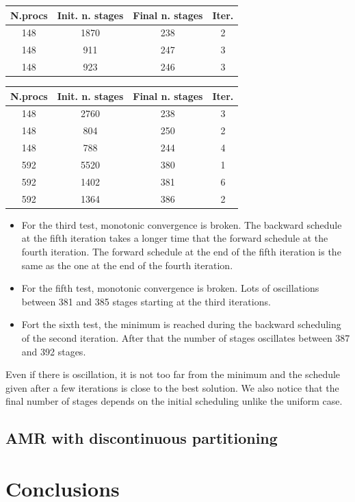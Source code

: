 \documentclass[letterpaper]{article}
\renewcommand{\(}{\left(}
\renewcommand{\)}{\right)}
\renewcommand{\[}{\left[}
\renewcommand{\]}{\right]}
\begin{document}
\begin{table}[H]
  \begin{center}
    \begin{tabular}{|c|c|c|c|}
      \hline
      N.procs & Init. n. stages & Final n. stages & Iter. \\
      \hline
      148 & 1870 & 238 & 2 \\
      148 &  911 & 247 & 3 \\
      148 &  923 & 246 & 3 \\
      \hline
    \end{tabular}
  \end{center}
\end{table}

\begin{table}[H]
  \begin{center}
    \begin{tabular}{|c|c|c|c|}
      \hline
      N.procs & Init. n. stages & Final n. stages & Iter. \\
      \hline
      148 & 2760 & 238 & 3 \\
      148 & 804  & 250 & 2 \\
      148 & 788  & 244 & 4 \\
      592 & 5520 & 380 & 1 \\
      592 & 1402 & 381 & 6 \\
      592 & 1364 & 386 & 2 \\
      \hline
    \end{tabular}
  \end{center}
\end{table}
\begin{itemize}
  \item For the third test, monotonic convergence is broken. The backward
    schedule at the fifth iteration takes a longer time that the forward
    schedule at the fourth iteration. The forward schedule at the end of the
    fifth iteration is the same as the one at the end of the fourth iteration.
  \item For the fifth test, monotonic convergence is broken. Lots of
    oscillations between 381 and 385 stages starting at the third iterations.
  \item Fort the sixth test, the minimum is reached during the backward
    scheduling of the second iteration. After that the number of stages
    oscillates between 387 and 392 stages.
\end{itemize}
Even if there is oscillation, it is not too far from the minimum and the
schedule given after a few iterations is close to the best solution. We also
notice that the final number of stages depends on the initial scheduling unlike
the uniform case.


\subsection{AMR with discontinuous partitioning}

\section{Conclusions}




\end{document}

